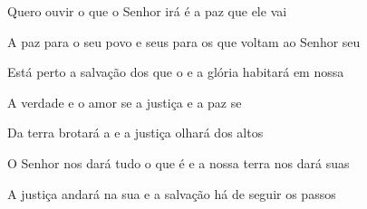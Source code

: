\begin{greenumerate}
  \item {}Quero ouvir o que o Senhor irá  é a paz que ele vai 

  \item {}A paz para o seu povo e seus  para os que voltam ao Senhor seu 

  \item {}Está perto a salvação dos que o  e a glória habitará em nossa 

  \item {}A verdade e o amor se  a justiça e a paz se 

  \item {}Da terra brotará a  e a justiça olhará dos altos 

  \item {}O Senhor nos dará tudo o que é  e a nossa terra nos dará suas 

  \item {}A justiça andará na sua  e a salvação há de seguir os passos 
\end{greenumerate}